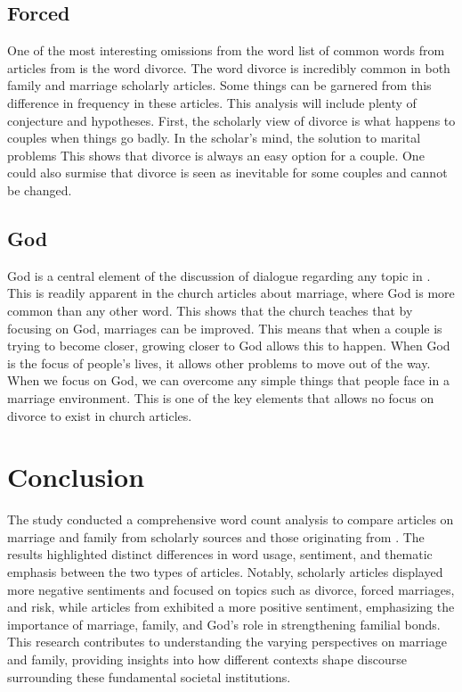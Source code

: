 \documentclass[twocolumn]{article}
\begin{document}
\subsection{Forced}

One of the most interesting omissions from the word list of common words from articles from \church is the word divorce. The word divorce is incredibly common in both family and marriage scholarly articles. Some things can be garnered from this difference in frequency in these articles. This analysis will include plenty of conjecture and hypotheses. First, the scholarly view of divorce is what happens to couples when things go badly. In the scholar's mind, the solution to marital problems This shows that divorce is always an easy option for a couple. One could also surmise that divorce is seen as inevitable for some couples and cannot be changed.

\subsection{God}

God is a central element of the discussion of dialogue regarding any topic in \church. This is readily apparent in the church articles about marriage, where God is more common than any other word. This shows that the church teaches that by focusing on God, marriages can be improved. This means that when a couple is trying to become closer, growing closer to God allows this to happen. When God is the focus of people's lives, it allows other problems to move out of the way. When we focus on God, we can overcome any simple things that people face in a marriage environment. This is one of the key elements that allows no focus on divorce to exist in church articles.

\section{Conclusion}

The study conducted a comprehensive word count analysis to compare articles on marriage and family from scholarly sources and those originating from \church. The results highlighted distinct differences in word usage, sentiment, and thematic emphasis between the two types of articles. Notably, scholarly articles displayed more negative sentiments and focused on topics such as divorce, forced marriages, and risk, while articles from \church exhibited a more positive sentiment, emphasizing the importance of marriage, family, and God's role in strengthening familial bonds. This research contributes to understanding the varying perspectives on marriage and family, providing insights into how different contexts shape discourse surrounding these fundamental societal institutions.

% 
\end{document}
